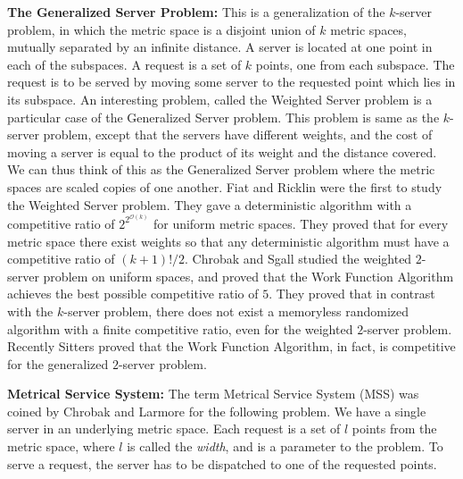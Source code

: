 \documentclass[11pt]{article}
\theoremstyle{plain}\newtheorem{theorem}{Theorem}
\theoremstyle{definition}
\theoremstyle{remark}
\begin{document}
\noindent
\textbf{The Generalized Server Problem:} This is a generalization of the $k$-server problem, in which the metric space is a disjoint union of $k$ metric spaces, mutually separated by an infinite distance. A server is located at one point in each of the subspaces. A request is a set of $k$ points, one from each subspace. The request is to be served by moving some server to the requested point which lies in its subspace. An interesting problem, called the Weighted Server problem \cite{FiatR94} is a particular case of the Generalized Server problem. This problem is same as the $k$-server problem, except that the servers have different weights, and the cost of moving a server is equal to the product of its weight and the distance covered. We can thus think of this as the Generalized Server problem where the metric spaces are scaled copies of one another. Fiat and Ricklin \cite{FiatR94} were the first to study the Weighted Server problem. They gave a deterministic algorithm with a competitive ratio of $2^{2^{\mathcal{O}(k)}}$ for uniform metric spaces. They proved that for every metric space there exist weights so that any deterministic algorithm must have a competitive ratio of $(k+1)!/2$. Chrobak and Sgall \cite{ChrobakS04} studied the weighted $2$-server problem on uniform spaces, and proved that the Work Function Algorithm achieves the best possible competitive ratio of $5$. They proved that in contrast with the $k$-server problem, there does not exist a memoryless randomized algorithm with a finite competitive ratio, even for the weighted $2$-server problem. Recently Sitters \cite{Sitters11} proved that the Work Function Algorithm, in fact, is competitive for the generalized $2$-server problem.

\noindent
\textbf{Metrical Service System:} The term Metrical Service System (MSS) was coined by Chrobak and Larmore \cite{ChrobakL93} for the following problem. We have a single server in an underlying metric space. Each request is a set of $l$ points from the metric space, where $l$ is called the \textit{width}, and is a parameter to the problem. To serve a request, the server has to be dispatched to one of the requested points.
\end{document}
